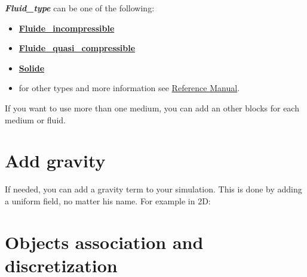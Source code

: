 {\bf{\textit{Fluid\_type}}} can be one of the following:
\begin{itemize}
\item \href{\REFERENCEMANUAL\#fluideincompressible}{\textbf{Fluide\_incompressible}}
\item \href{\REFERENCEMANUAL\#fluidequasicompressible}{\textbf{Fluide\_quasi\_compressible}}
\item \href{\REFERENCEMANUAL\#solide}{\textbf{Solide}}
\item for other types and more information see \href{\REFERENCEMANUAL\#milieubase}{\trustref Reference Manual}.
\end{itemize}

If you want to use more than one medium, you can add an other blocks for each medium or fluid.\\





\section{Add gravity}
If needed, you can add a gravity term to your simulation. This is done by adding
a uniform field, no matter his name. For example in 2D:

    \begin{center}
    \end{center}




\section{Objects association and discretization}
